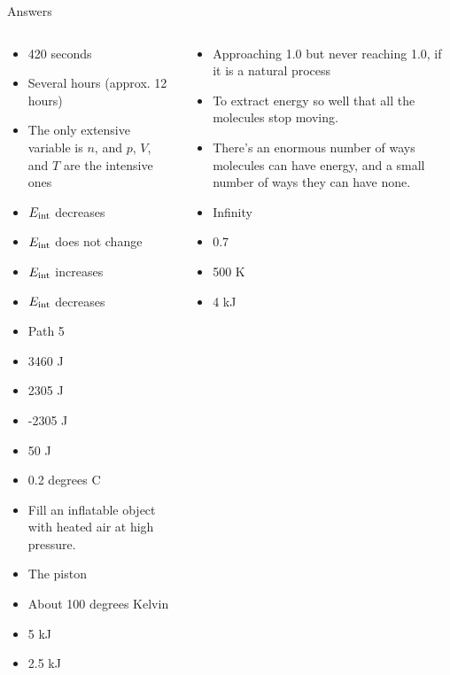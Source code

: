 \documentclass{beamer}
\begin{document}
\begin{frame}{Answers}
\tiny
\begin{columns}[T]
\begin{column}{0.5\textwidth}
\begin{itemize}
\item 420 seconds
\item Several hours (approx. 12 hours)
\item The only extensive variable is $n$, and $p$, $V$, and $T$ are the intensive ones
\item $E_{\rm int}$ decreases
\item $E_{\rm int}$ does not change
\item $E_{\rm int}$ increases
\item $E_{\rm int}$ decreases
\item Path 5
\item 3460 J
\item 2305 J
\item -2305 J
\item 50 J
\item 0.2 degrees C
\item Fill an inflatable object with heated air at high pressure.
\item The piston
\item About 100 degrees Kelvin
\item 5 kJ
\item 2.5 kJ
\end{itemize}
\end{column}
\begin{column}{0.5\textwidth}
\begin{itemize}
\item Approaching 1.0 but never reaching 1.0, if it is a natural process
\item To extract energy so well that all the molecules stop moving.
\item There's an enormous number of ways molecules can have energy, and a small number of ways they can have none.
\item Infinity
\item 0.7
\item 500 K
\item 4 kJ
\end{itemize}
\end{column}
\end{columns}
\end{frame}
\end{document}
